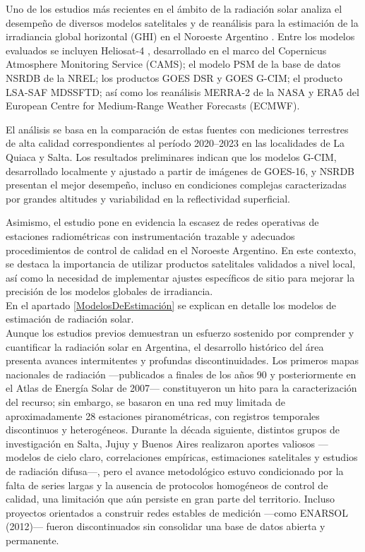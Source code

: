 Uno de los estudios más recientes en el ámbito de la radiación solar analiza el desempeño de diversos modelos satelitales y de reanálisis para la estimación de la irradiancia global horizontal (GHI) en el Noroeste Argentino \cite{Ledesma2025}. Entre los modelos evaluados se incluyen Heliosat-4 \citep{qu2017}, desarrollado en el marco del Copernicus Atmosphere Monitoring Service (CAMS); el modelo PSM de la base de datos NSRDB de la NREL; los productos GOES DSR y GOES G-CIM; el producto LSA-SAF MDSSFTD; así como los reanálisis MERRA-2 de la NASA y ERA5 del European Centre for Medium-Range Weather Forecasts (ECMWF).

El análisis se basa en la comparación de estas fuentes con mediciones terrestres de alta calidad correspondientes al período 2020--2023 en las localidades de La Quiaca y Salta. Los resultados preliminares indican que los modelos G-CIM, desarrollado localmente y ajustado a partir de imágenes de GOES-16, y NSRDB presentan el mejor desempeño, incluso en condiciones complejas caracterizadas por grandes altitudes y variabilidad en la reflectividad superficial.

Asimismo, el estudio pone en evidencia la escasez de redes operativas de estaciones radiométricas con instrumentación trazable y adecuados procedimientos de control de calidad en el Noroeste Argentino. En este contexto, se destaca la importancia de utilizar productos satelitales validados a nivel local, así como la necesidad de implementar ajustes específicos de sitio para mejorar la precisión de los modelos globales de irradiancia.\\

En el apartado \ref{ModelosDeEstimación} se explican en detalle los modelos de estimación de radiación solar.\\ 

Aunque los estudios previos demuestran un esfuerzo sostenido por comprender y cuantificar la radiación solar en Argentina, el desarrollo histórico del área presenta avances intermitentes y profundas discontinuidades. Los primeros mapas nacionales de radiación —publicados a finales de los años 90 y posteriormente en el Atlas de Energía Solar de 2007— constituyeron un hito para la caracterización del recurso; sin embargo, se basaron en una red muy limitada de aproximadamente 28 estaciones piranométricas, con registros temporales discontinuos y heterogéneos. Durante la década siguiente, distintos grupos de investigación en Salta, Jujuy y Buenos Aires realizaron aportes valiosos —modelos de cielo claro, correlaciones empíricas, estimaciones satelitales y estudios de radiación difusa—, pero el avance metodológico estuvo condicionado por la falta de series largas y la ausencia de protocolos homogéneos de control de calidad, una limitación que aún persiste en gran parte del territorio. Incluso proyectos orientados a construir redes estables de medición —como ENARSOL (2012)— fueron discontinuados sin consolidar una base de datos abierta y permanente.

